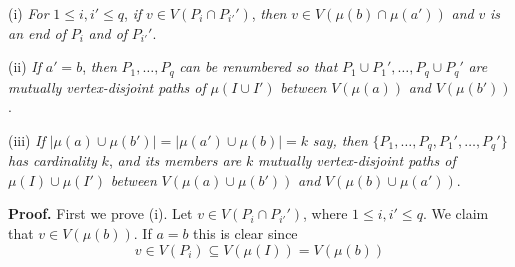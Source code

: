 \hspace*{12pt}(i) \textit{For} $1 \le i, i' \le q$, \textit{if} $v \in V(P_i \cap P_{i'}')$, \textit{then} $v \in V(\mu(b) \cap \mu(a'))$ \textit{and} $v$ \textit{is an end of} $P_i$ \textit{and of} $P_{i'}'$.

\hspace*{12pt}(ii) \textit{If} $a' = b$, \textit{then} $P_1, \dots, P_q$ \textit{can be renumbered so that} $P_1 \cup P_1', \dots, P_q \cup P_q'$ \textit{are mutually vertex-disjoint paths of} $\mu(I \cup I')$ \textit{between} $V(\mu(a))$ \textit{and} $V(\mu(b'))$.

\hspace*{12pt}(iii) \textit{If} $|\mu(a) \cup \mu(b')| = |\mu(a') \cup \mu(b)| = k$ \textit{say, then} $\{P_1, \dots, P_q, P_1', \dots, P_q'\}$ \textit{has cardinality} $k$, \textit{and its members are} $k$ \textit{mutually vertex-disjoint paths of} $\mu(I) \cup \mu(I')$ \textit{between} $V(\mu(a) \cup \mu(b'))$ \textit{and} $V(\mu(b) \cup \mu(a'))$.

\textbf{Proof.} First we prove (i). Let $v \in V(P_i \cap P_{i'}')$, where $1 \le i, i' \le q$. We claim that $v \in V(\mu(b))$. If $a = b$ this is clear since
\begin{equation*}
v \in V(P_i) \subseteq V(\mu(I)) = V(\mu(b))
\end{equation*}
